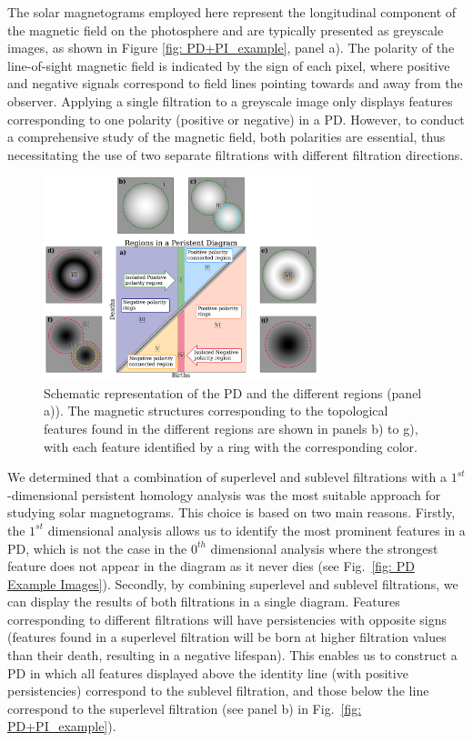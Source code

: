 \documentclass[12pt]{mythesis}
\begin{document}
The solar magnetograms employed here represent the longitudinal component of the magnetic field on the photosphere and are typically presented as greyscale images, as shown in Figure \ref{fig: PD+PI_example}, panel a). The polarity of the line-of-sight magnetic field is indicated by the sign of each pixel, where positive and negative signals correspond to field lines pointing towards and away from the observer. Applying a single filtration to a greyscale image only displays features corresponding to one polarity (positive or negative) in a PD. However, to conduct a comprehensive study of the magnetic field, both polarities are essential, thus necessitating the use of two separate filtrations with different filtration directions.

\begin{figure}
    \centering
     \includegraphics[width=8cm]{Figures/PersistentHomology/Regions_anotated.pdf}
    \caption{Schematic representation of the PD and the different regions (panel a)). The magnetic structures corresponding to the topological features found in the different regions are shown in panels b) to g), with each feature identified by a ring with the corresponding color.}
   \label{fig: PD REGIONS}
\end{figure}

We determined that a combination of superlevel and sublevel filtrations with a $1^{st}$-dimensional persistent homology analysis was the most suitable approach for studying solar magnetograms. This choice is based on two main reasons. Firstly, the $1^{st}$ dimensional analysis allows us to identify the most prominent features in a PD, which is not the case in the $0^{th}$ dimensional analysis where the strongest feature does not appear in the diagram as it never dies (see Fig.~\ref{fig: PD Example Images}). Secondly, by combining superlevel and sublevel filtrations, we can display the results of both filtrations in a single diagram. Features corresponding to different filtrations will have persistencies with opposite signs (features found in a superlevel filtration will be born at higher filtration values than their death, resulting in a negative lifespan). This enables us to construct a PD in which all features displayed above the identity line (with positive persistencies) correspond to the sublevel filtration, and those below the line correspond to the superlevel filtration (see panel b) in Fig.~\ref{fig: PD+PI_example}).
\end{document}
